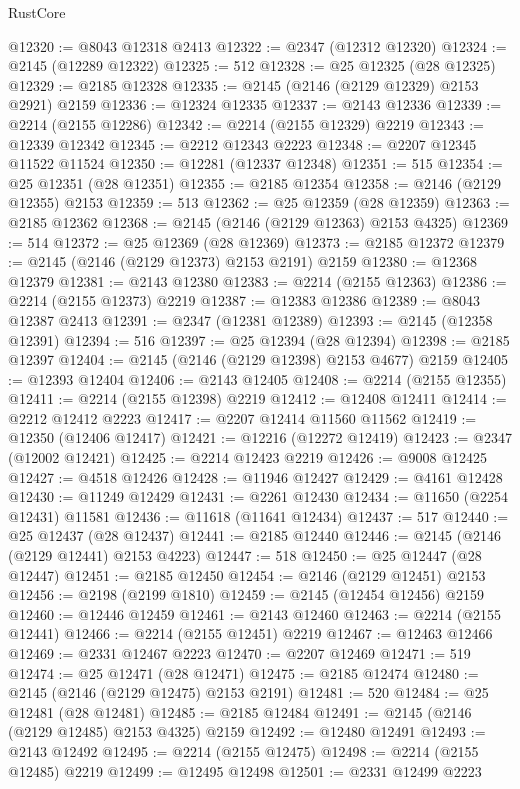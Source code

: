 \begin{lexlean}{RustCore}
\begin{coremodule}
@12320 := @8043 @12318 @2413
@12322 := @2347 (@12312 @12320)
@12324 := @2145 (@12289 @12322)
@12325 := 512
@12328 := @25 @12325 (@28 @12325)
@12329 := @2185 @12328
@12335 := @2145 (@2146 (@2129 @12329) @2153 @2921) @2159
@12336 := @12324 @12335
@12337 := @2143 @12336
@12339 := @2214 (@2155 @12286)
@12342 := @2214 (@2155 @12329) @2219
@12343 := @12339 @12342
@12345 := @2212 @12343 @2223
@12348 := @2207 @12345 @11522 @11524
@12350 := @12281 (@12337 @12348)
@12351 := 515
@12354 := @25 @12351 (@28 @12351)
@12355 := @2185 @12354
@12358 := @2146 (@2129 @12355) @2153
@12359 := 513
@12362 := @25 @12359 (@28 @12359)
@12363 := @2185 @12362
@12368 := @2145 (@2146 (@2129 @12363) @2153 @4325)
@12369 := 514
@12372 := @25 @12369 (@28 @12369)
@12373 := @2185 @12372
@12379 := @2145 (@2146 (@2129 @12373) @2153 @2191) @2159
@12380 := @12368 @12379
@12381 := @2143 @12380
@12383 := @2214 (@2155 @12363)
@12386 := @2214 (@2155 @12373) @2219
@12387 := @12383 @12386
@12389 := @8043 @12387 @2413
@12391 := @2347 (@12381 @12389)
@12393 := @2145 (@12358 @12391)
@12394 := 516
@12397 := @25 @12394 (@28 @12394)
@12398 := @2185 @12397
@12404 := @2145 (@2146 (@2129 @12398) @2153 @4677) @2159
@12405 := @12393 @12404
@12406 := @2143 @12405
@12408 := @2214 (@2155 @12355)
@12411 := @2214 (@2155 @12398) @2219
@12412 := @12408 @12411
@12414 := @2212 @12412 @2223
@12417 := @2207 @12414 @11560 @11562
@12419 := @12350 (@12406 @12417)
@12421 := @12216 (@12272 @12419)
@12423 := @2347 (@12002 @12421)
@12425 := @2214 @12423 @2219
@12426 := @9008 @12425
@12427 := @4518 @12426
@12428 := @11946 @12427
@12429 := @4161 @12428
@12430 := @11249 @12429
@12431 := @2261 @12430
@12434 := @11650 (@2254 @12431) @11581
@12436 := @11618 (@11641 @12434)
@12437 := 517
@12440 := @25 @12437 (@28 @12437)
@12441 := @2185 @12440
@12446 := @2145 (@2146 (@2129 @12441) @2153 @4223)
@12447 := 518
@12450 := @25 @12447 (@28 @12447)
@12451 := @2185 @12450
@12454 := @2146 (@2129 @12451) @2153
@12456 := @2198 (@2199 @1810)
@12459 := @2145 (@12454 @12456) @2159
@12460 := @12446 @12459
@12461 := @2143 @12460
@12463 := @2214 (@2155 @12441)
@12466 := @2214 (@2155 @12451) @2219
@12467 := @12463 @12466
@12469 := @2331 @12467 @2223
@12470 := @2207 @12469
@12471 := 519
@12474 := @25 @12471 (@28 @12471)
@12475 := @2185 @12474
@12480 := @2145 (@2146 (@2129 @12475) @2153 @2191)
@12481 := 520
@12484 := @25 @12481 (@28 @12481)
@12485 := @2185 @12484
@12491 := @2145 (@2146 (@2129 @12485) @2153 @4325) @2159
@12492 := @12480 @12491
@12493 := @2143 @12492
@12495 := @2214 (@2155 @12475)
@12498 := @2214 (@2155 @12485) @2219
@12499 := @12495 @12498
@12501 := @2331 @12499 @2223

\end{coremodule}
\end{lexlean}

